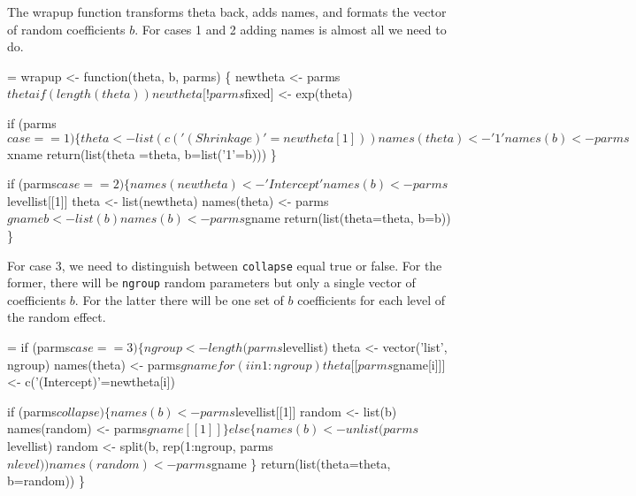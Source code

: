 \documentclass{article}
\begin{document}
 

The wrapup function transforms theta back, adds names, and
formats the vector of random coefficients $b$.
For cases 1 and 2 adding names is almost all we need to do.
\begin{nwchunk}
=
 wrapup <- function(theta, b, parms) \{
     newtheta <- parms$theta
     if (length(theta)) newtheta[!parms$fixed] <- exp(theta)
     
     if (parms$case==1) \{
         theta <- list(c('(Shrinkage)' = newtheta[1]))
         names(theta) <- '1'
         names(b) <- parms$xname
         return(list(theta =theta, b=list('1'=b)))
         \}
 
     if (parms$case==2) \{
         names(newtheta) <- 'Intercept'
         names(b) <- parms$levellist[[1]]
         theta <- list(newtheta)
         names(theta) <- parms$gname
         b <- list(b)
         names(b) <- parms$gname
         return(list(theta=theta, b=b))
         \}
\end{nwchunk}

For case 3, we need to distinguish between \Verb!collapse! equal true or
false.  For the former, there will be \Verb!ngroup! random parameters but
only a single vector of coefficients $b$.
For the latter there will be one set of $b$ coefficients for each
level of the random effect.
\begin{nwchunk}
=
     if (parms$case==3) \{
         ngroup <- length(parms$levellist)
         theta <- vector('list', ngroup)
         names(theta) <- parms$gname
         for (i in 1:ngroup) 
             theta[[parms$gname[i]]] <- c('(Intercept)'=newtheta[i])
 
         if (parms$collapse) \{
             names(b) <- parms$levellist[[1]]
             random <- list(b)
             names(random) <- parms$gname[[1]]
             \}
         else \{
             names(b) <- unlist(parms$levellist)
             random <- split(b, rep(1:ngroup, parms$nlevel))
             names(random) <- parms$gname
             \}
         return(list(theta=theta, b=random))
         \}
\end{nwchunk}
\end{document}
